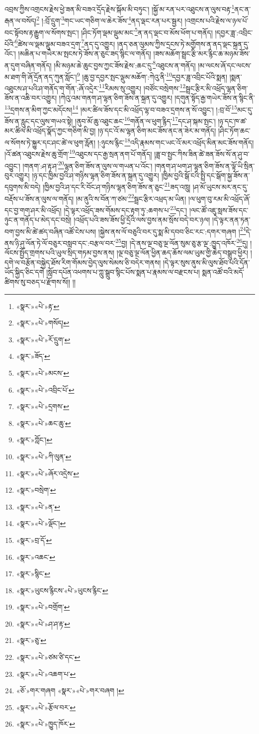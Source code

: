 འབྲས་ཀྱིས་འགྲངས་རྗེས་ཕྱེ་ཟན་མི་བཟའ་དྲོད་རྗེས་སྐོམ་མི་བཏུང་། །སྐྱོ་མ་རན་པར་འཐུངས་ན་ལུས་བརྟ་\footnote{«སྣར་»«པེ་»རྟ་}ནང་ན་རྒན་ལ་བསོད།\footnote{«སྣར་»«པེ་»གསོད།} །:བྲོ་དྲུག་\footnote{«སྣར་»«པེ་»རོ་དྲུག་}གང་ཡང་གཅིག་ལ་ཆེར་ཟོས་\footnote{«སྣར་»ཟོད་}ནད་ལྡང་རན་པར་སྦྱར། །འགྲངས་པའི་རྗེས་ལ་ཉལ་པོ་བང་སྟོབས་རྟ་རྒྱུག་ལ་སོགས་སྤང་། །ཤིང་ཏོག་ལྡམ་ལྡུམ་མང་\footnote{«སྣར་»«པེ་»མངས་}ན་ནད་ལྡང་བ་མོས་ཕོག་པ་གནོད། །དབྱར་ཟླ་:འབྲིང་པོའི་\footnote{«སྣར་»«པེ་»འབྲིང་པོ་}ཚེས་ལ་ལྡམ་ལྡུམ་བཟའ་དྲག་\footnote{«སྣར་»«པེ་»དྲགས་}ནད་དུ་འགྱུར། །ནད་ཅན་ལུམས་ཀྱིས་དྲངས་ཏེ་མགྱོགས་ན་ནད་ལྡང་སྐྲན་དུ་འོང་། །མཆིན་པ་གཡེར་མ་སྤངས་ཏེ་ཟོས་ན་ཅུང་ཟད་སྙིང་ལ་གནོད། །ཟས་མཆོག་སྦྲང་རྩི་མར་རྙིང་ཆ་མཉམ་ཟོས་ན་དུག་བཞིན་གནོད། །མི་མཉམ་ཆེ་ཆུང་བྱས་ཀྱང་ཟོས་རྗེས་:ཆང་དུ་\footnote{«སྣར་»«པེ་»ཆང་ཆུ་}འཐུངས་ན་གནོད། །མ་ལངས་ཞོ་དང་ལངས་མ་ཐག་གི་ཞོ་དྲོན་ནད་ཀུན་སློང་།\footnote{«སྣར་»ཀློང་།} །ཆུ་བྱ་དབྱར་སྤང་ལྡུམ་མཆོག་:ཀེའུ་ནི་\footnote{«སྣར་»«པེ་»ཀི་ལུན་}དབྱར་ཟླ་འབྲིང་པོའི་སྨན། །སྨན་འཐུངས་ཤ་པའི་ཤ་གནོད་ག་གོན་:ཞོ་འདྲེར་\footnote{«སྣར་»«པེ་»ཞོར་འདྲེས་}རིམས་སུ་འགྱུར། །བཙོང་བསྲེགས་\footnote{«སྣར་»བསྲེག་}སྦྲང་རྩིར་མི་འཕྲོད་ལྷན་ཅིག་ཟོས་ན་འཆི་བར་འགྱུར། །ཀེའུ་འམ་གནག་ཤ་ལྷན་ཅིག་ཟོས་ན་སྐྲན་དུ་འགྱུར། །དགུན་སྟོད་རྒྱ་གཡེར་ཟོས་ན་སྙིང་ནི་\footnote{«སྣར་»«པེ་»ན་}དྲགས་ན་མིག་ཀྱང་མདོངས།\footnote{«སྣར་»«པེ་»ལྡོང་།} །མར་ཚིལ་ཟོས་དང་མི་འཕྲོད་ལྷ་བ་བཟའ་དྲགས་ན་སོ་འབྱུང་། །:བྲ་བོ་\footnote{«སྣར་»བྲ་དོ་}མང་དུ་ཟོས་ན་རླུང་དང་ལུས་གཡའ་སྟེ། །ནུབ་མོ་ཆུ་འཐུང་ཆང་\footnote{«སྣར་»འཆང་}གནོན་ལ་ཕུག་རྙིད་\footnote{«སྣར་»སྙིང་}དང་ཤ་སྐམ་སྤང་། །ཉ་དང་ཁ་ཚ་མར་ཚིལ་མི་འཕྲོད་སྣོད་ཀྱང་གཅིག་མི་བྱ། །ཉ་དང་འོ་མ་ལྷན་ཅིག་མང་ཟོས་ནང་ན་ཟེར་མ་གནོད། །ཤིང་ཏོག་ཆང་ལ་སོགས་ཏེ་སྐྱུར་དང་ཤང་ཚེ་ལ་ཕུག་རློན། །:ཉུངས་རྙིང་\footnote{«སྣར་»ཡུངས་རྙིངས་«པེ་»ཡུངས་རྙིང་}འདི་རྣམས་གང་ཡང་འོ་མར་འཕྲོད་མིན་མང་ཟོས་གནོད། །འོ་ཚན་འཐུངས་རྗེས་ཆུ་གྲོག་\footnote{«སྣར་»«པེ་»བགྲོག་}འཐུངས་དང་རྒྱ་སྲན་ནག་པོ་གནོད། །ཟླ་བ་སྤྱང་ཀིས་ཟིན་ཚེ་ཟན་ཟོས་སོ་ན་ཤུ་བ་འབྱུང་། །གནག་:ཤ་རྟ་ཤ་\footnote{«སྣར་»«པེ་»ཤ་ཤ་རྟ་}ལྷན་ཅིག་ཟོས་ན་ལུས་ལ་གཡན་པ་འོང་། །གནག་ཤ་ཕག་ཤ་ལྷན་ཅིག་ཟོས་ན་ལྟོ་ཡི་སྲིན་བུར་འགྱུར། །ཉ་དང་ཁྱིམ་བྱའི་ཤ་གཉིས་ལྷན་ཅིག་ཟོས་ན་སྐྲན་དུ་འགྱུར། །ཁྱིམ་བྱའི་སྒོ་ངའི་སྤྲི་དང་སྒོག་སྐྱ་ཟོས་ན་དབུགས་མི་བདེ། །ཁྱིམ་བྱའི་ཤ་དང་རི་བོང་ཤ་གཉིས་ལྷན་ཅིག་ཟོས་ན་ཅུང་\footnote{«སྣར་»ཅུ་}ཟད་འཁྲུ། །ཤ་མོ་ཡུངས་མར་ནང་དུ་བརྡོས་པ་ཟོས་ན་ལུས་ལ་གནོད། །མ་ནུའི་ས་བོན་ཀ་ཙམ་\footnote{«སྣར་»«པེ་»ཙམ་ཙི་དང་}སྦྲང་རྩིར་འཕྲད་མ་ཡིན། །ལ་ཕུག་བུ་རམ་མི་འཕྲོད་ཞོ་དང་བྱ་གག་ཤར་མི་འཕྲོད། །དེ་ལྟར་འཕྲོད་ཟས་གོམས་དང་རྟག་ཏུ་:ཆགས་པ་\footnote{«སྣར་»«པེ་»འཆག་པ་}དང་། །ལང་ཚོ་འཇུ་སླས་ཟོས་དང་ཉུང་ན་གནོད་པ་མེད་དང་བསྲེ། །འཕྲོད་པའི་ཟས་ཟོས་ཕྱི་དྲོའི་ལས་བྱས་ནམ་སྲོས་བདེ་བར་ཉལ། །དེ་ལྟར་ནན་ཏན་བག་བྱས་མི་ཚེ་ཚད་བཞིན་འཚོ་ངེས་པས། །སྐྱེས་ནས་ལོ་བཅུའི་བར་དུ་སྨ་མི་དབབ་ཅིང་རང་:དགར་གཞག །\footnote{«ཅོ་»གར་གཞག «སྣར་»«པེ་»གར་བཞག །}དེ་ནས་ཉི་ཤུ་ལོན་ཏེ་ལོ་བཅུར་བསླབ་དང་:བརྩལ་བར་\footnote{«སྣར་»«པེ་»རྩོལ་བར་}བྱ། །དེ་ནས་ལྔ་བཅུ་ལྔ་ལོན་སུམ་ཅུ་རྩ་ལྔ་:ཁྱུད་འཁོར་\footnote{«སྣར་»«པེ་»ཁྱུད་ཁོར་}དུ། །ལོངས་སྤྱོད་གྲགས་པའི་ཡུལ་སྲིད་གཏམ་བྱས་ནས། །ལྔ་བཅུ་ལྔ་ལོན་ཕྱིན་ཆད་ཆོས་ལམ་ཡུམ་གྱི་ཆེད་བསྒྲུབ་ཕྱིར། །དགེ་ལ་བརྩོན་བསྐྱེད་ཐོས་རིག་གོམས་བྱེད་ལུས་སེམས་ཅི་བདེར་གནས། །དེ་ལྟར་སུས་ནུས་མི་ལུས་ཐོབ་པའི་དོན་ཡོད་སྐྱིད་ཅིང་དགེ །སློབ་དཔོན་འཕགས་པ་ཀླུ་སྒྲུབ་སྙིང་པོས་སྨན་པ་རྣམས་ལ་བརྫངས་པ། སྨན་འཚོ་བའི་མདོ་ཚིགས་སུ་བཅད་པ་རྫོགས་སོ།། །།